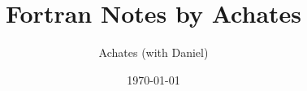 \documentclass[10pt]{book}
\begin{document}
\frontmatter

\title{Fortran Notes by Achates}
\author{Achates (with Daniel)}
\date{\today}
\maketitle

	
\tableofcontents

\mainmatter
	
	

\printbibliography
\end{document}
